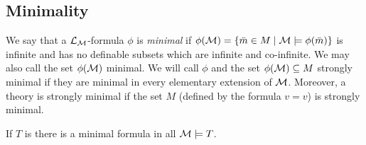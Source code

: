 \subsection{Minimality}

\begin{definition}\label{definition_minimality}
We say that a \(\mathcal{L}_{\mathcal{M}}\)-formula \(\phi\) is \textit{minimal} if \(\phi(\mathcal{M}) = \{\bar{m} \in M \mid \mathcal{M} \models \phi(\bar{m})\}\) is infinite and has no definable subsets which are infinite and co-infinite. 
We may also call the set \(\phi(\mathcal{M})\) minimal. 
We will call \(\phi\) and the set \(\phi(\mathcal{M}) \subseteq M\) 
strongly minimal if they are minimal in every elementary extension of \(\mathcal{M}\).
Moreover, a theory is strongly minimal if the set \(M\) (defined by the formula \(v = v\)) is strongly minimal. 
\end{definition}

\begin{lemma}\label{lemma_minimal_omst}
If \(T\) is \omst there is a minimal formula in all \(\mathcal{M} \models T\).
\end{lemma}


